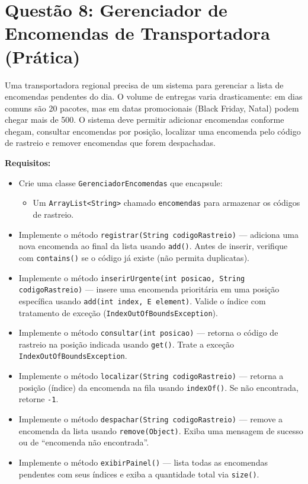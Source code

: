 \documentclass[12pt, a4paper]{article}
\begin{document}
\vspace{0.2cm}

\section*{Questão 8: Gerenciador de Encomendas de Transportadora (Prática)}
Uma transportadora regional precisa de um sistema para gerenciar a lista de encomendas pendentes do dia. O volume de entregas varia drasticamente: em dias comuns são 20 pacotes, mas em datas promocionais (Black Friday, Natal) podem chegar mais de 500. O sistema deve permitir adicionar encomendas conforme chegam, consultar encomendas por posição, localizar uma encomenda pelo código de rastreio e remover encomendas que forem despachadas.

\textbf{Requisitos:}
\begin{itemize}
    \item Crie uma classe \texttt{GerenciadorEncomendas} que encapsule:
    \begin{itemize}
        \item Um \texttt{ArrayList<String>} chamado \texttt{encomendas} para armazenar os códigos de rastreio.
    \end{itemize}
    \item Implemente o método \texttt{registrar(String codigoRastreio)} — adiciona uma nova encomenda ao final da lista usando \texttt{add()}. Antes de inserir, verifique com \texttt{contains()} se o código já existe (não permita duplicatas).
    \item Implemente o método \texttt{inserirUrgente(int posicao, String codigoRastreio)} — insere uma encomenda prioritária em uma posição específica usando \texttt{add(int index, E element)}. Valide o índice com tratamento de exceção (\texttt{IndexOutOfBoundsException}).
    \item Implemente o método \texttt{consultar(int posicao)} — retorna o código de rastreio na posição indicada usando \texttt{get()}. Trate a exceção \texttt{IndexOutOfBoundsException}.
    \item Implemente o método \texttt{localizar(String codigoRastreio)} — retorna a posição (índice) da encomenda na fila usando \texttt{indexOf()}. Se não encontrada, retorne \texttt{-1}.
    \item Implemente o método \texttt{despachar(String codigoRastreio)} — remove a encomenda da lista usando \texttt{remove(Object)}. Exiba uma mensagem de sucesso ou de ``encomenda não encontrada''.
    \item Implemente o método \texttt{exibirPainel()} — lista todas as encomendas pendentes com seus índices e exiba a quantidade total via \texttt{size()}.

\end{itemize}
\end{document}
